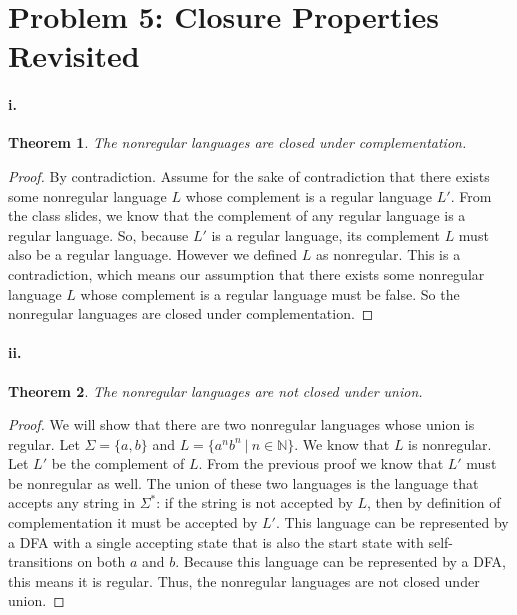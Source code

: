 \documentclass[10pt,letter]{article}
\newtheorem*{thm}{Theorem}
\begin{document}
\section*{Problem 5: Closure Properties Revisited}
\paragraph{i.}
\begin{thm} The nonregular languages are closed under complementation. \end{thm}
\begin{proof}
By contradiction. Assume for the sake of contradiction that there exists some nonregular language $L$ whose complement is a regular language $L'$. From the class slides, we know that the complement of any regular language is a regular language. So, because $L'$ is a regular language, its complement $L$ must also be a regular language. However we defined $L$ as nonregular. This is a contradiction, which means our assumption that there exists some nonregular language $L$ whose complement is a regular language must be false. So the nonregular languages are closed under complementation.
\end{proof}

\paragraph{ii.}
\begin{thm} The nonregular languages are not closed under union. \end{thm}
\begin{proof} We will show that there are two nonregular languages whose union is regular. Let $\Sigma = \{a, b\}$ and $L = \{a^nb^n \ | \ n \in \mathbb{N} \}$. We know that $L$ is nonregular. Let $L'$ be the complement of $L$. From the previous proof we know that $L'$ must be nonregular as well. The union of these two languages is the language that accepts any string in $\Sigma^*$: if the string is not accepted by $L$, then by definition of complementation it must be accepted by $L'$. This language can be represented by a DFA with a single accepting state that is also the start state with self-transitions on both $a$ and $b$. Because this language can be represented by a DFA, this means it is regular. Thus, the nonregular languages are not closed under union.
\end{proof}
\end{document}
